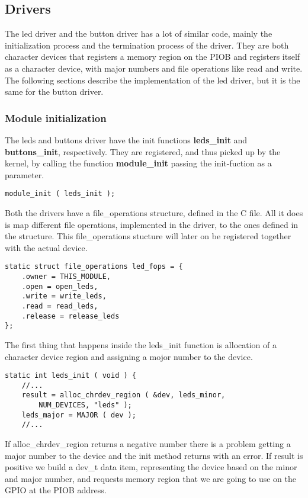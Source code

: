 \subsection{Drivers}
The led driver and the button driver has a lot of similar code, mainly 
the initialization process and the termination process of the driver. 
They are both character devices that registers a memory region on the 
PIOB and registers itself as a character device, with major numbers and 
file operations like read and write. The following sections 
describe the implementation of the led driver, but it is the same for
the button driver.

\subsubsection{Module initialization}
The leds and buttons driver have the init functions \textbf{leds\_init}
and \textbf{buttons\_init}, respectively. They are registered, and thus 
picked up by the kernel, by calling the function \textbf{module\_init}
passing the init-fuction as a parameter.
\\
\begin{lstlisting}
module_init ( leds_init );
\end{lstlisting}
Both the drivers have a file\_operations structure,
defined in the C file. All it does is map different file operations,
implemented in the driver, to the ones defined in the structure.
This file\_operations stucture will later on be registered together
with the actual device.
\\
\begin{lstlisting}
static struct file_operations led_fops = {
	.owner = THIS_MODULE,
	.open = open_leds,
	.write = write_leds,
	.read = read_leds,
	.release = release_leds
};
\end{lstlisting}
The first thing that happens inside the leds\_init function
is allocation of a character device region
and assigning a mojor number to the device.
\\
\begin{lstlisting}
static int leds_init ( void ) {
	//...
	result = alloc_chrdev_region ( &dev, leds_minor, 
		NUM_DEVICES, "leds" );
	leds_major = MAJOR ( dev );
	//...
\end{lstlisting}
If alloc\_chrdev\_region returns a negative number there is a problem getting
a major number to the device and the init method returns with an error.
If result is positive we build a dev\_t data item, 
representing the device based on the minor and major number, and requests memory region that we are going to use on the GPIO at the PIOB address.
